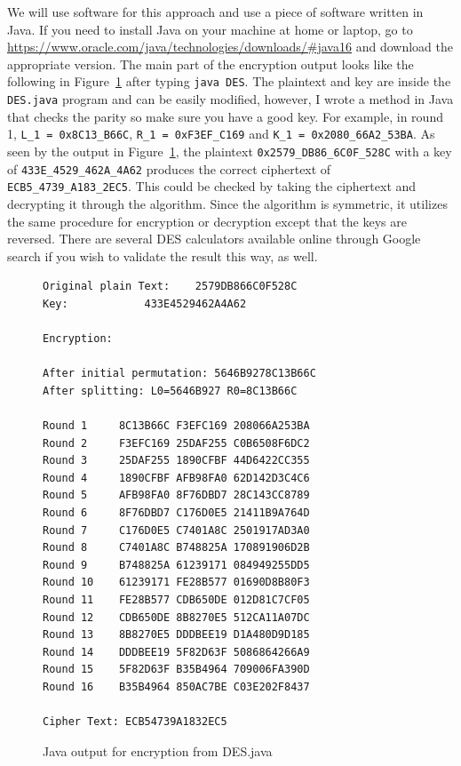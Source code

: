 \documentclass{article}
\begin{document}
We will use software for this approach
and use a piece of software written in Java.
If you need
to install Java on your machine at home or laptop, go to
\url{https://www.oracle.com/java/technologies/downloads/#java16} and
download the appropriate version.
The main part of the encryption output looks like the following in
Figure~\ref{des.java} after
typing \verb!java DES!.  The plaintext and
key are inside the \verb!DES.java! program
and can be easily modified, however, I wrote a method in Java that
checks the
parity so make sure you have a good key.  For example, in round 1,
\verb!L_1 = 0x8C13_B66C!, \verb!R_1 = 0xF3EF_C169! and
\verb!K_1 = 0x2080_66A2_53BA!.  As seen by the output in
Figure~\ref{des.java}, the plaintext \verb!0x2579_DB86_6C0F_528C! with
a key of \verb!433E_4529_462A_4A62! produces the correct ciphertext of
\verb!ECB5_4739_A183_2EC5!.
This could be checked by taking the ciphertext and decrypting it
through the algorithm.  Since the algorithm is symmetric, it utilizes
the same procedure for encryption or decryption except that the keys
are reversed.
There are several DES calculators
available online through Google search if you wish to validate the
result this way, as well. 
\begin{figure}
\begin{verbatim}
Original plain Text:	2579DB866C0F528C
Key:			433E4529462A4A62

Encryption:

After initial permutation: 5646B9278C13B66C
After splitting: L0=5646B927 R0=8C13B66C

Round 1 	8C13B66C F3EFC169 208066A253BA
Round 2 	F3EFC169 25DAF255 C0B6508F6DC2
Round 3 	25DAF255 1890CFBF 44D6422CC355
Round 4 	1890CFBF AFB98FA0 62D142D3C4C6
Round 5 	AFB98FA0 8F76DBD7 28C143CC8789
Round 6 	8F76DBD7 C176D0E5 21411B9A764D
Round 7 	C176D0E5 C7401A8C 2501917AD3A0
Round 8 	C7401A8C B748825A 170891906D2B
Round 9 	B748825A 61239171 084949255DD5
Round 10 	61239171 FE28B577 01690D8B80F3
Round 11 	FE28B577 CDB650DE 012D81C7CF05
Round 12 	CDB650DE 8B8270E5 512CA11A07DC
Round 13 	8B8270E5 DDDBEE19 D1A480D9D185
Round 14 	DDDBEE19 5F82D63F 5086864266A9
Round 15 	5F82D63F B35B4964 709006FA390D
Round 16 	B35B4964 850AC7BE C03E202F8437

Cipher Text: ECB54739A1832EC5
\end{verbatim}
\caption{Java output for encryption from DES.java}
\label{des.java}
\end{figure}
\end{document}
